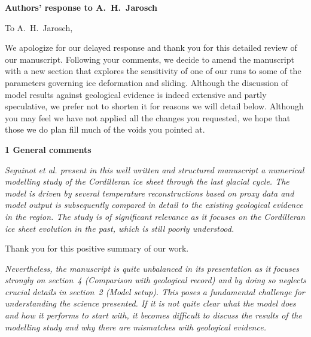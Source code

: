 \documentclass[10pt]{article}
\begin{document}
\textbf{Authors' response to A.~H.~Jarosch}
\bigskip


\newcommand{\doi}[1]{doi:\allowbreak\href{http://dx.doi.org/#1}{#1}}
\newcommand{\sechead}[1]{\bigskip\noindent\textbf{#1}}
\newcommand{\referee}[1]{\bigskip\textcolor{journalname}{\textit{#1}}}
\newcommand{\msquote}[1]{\begin{quote}\textit{#1}\end{quote}}
\newcommand{\todo}[1]{\textcolor{adgeored}{TODO: #1}}

To A.~H.~Jarosch,

We apologize for our delayed response and thank you for this detailed review of
our manuscript. Following your comments, we decide to amend the manuscript with
a new section that explores the sensitivity of one of our runs to some of the
parameters governing ice deformation and sliding. Although the discussion of
model results against geological evidence is indeed extensive and partly
speculative, we prefer not to shorten it for reasons we will detail below.
Although you may feel we have not applied all the changes you requested, we
hope that those we do plan fill much of the voids you pointed at.


\sechead{1 \quad General comments}

\referee{%
    Seguinot et al. present in this well written and structured manuscript a
    numerical modelling study of the Cordilleran ice sheet through the last
    glacial cycle. The model is driven by several temperature reconstructions
    based on proxy data and model output is subsequently compared in detail to
    the existing geological evidence in the region. The study is of significant
    relevance as it focuses on the Cordilleran ice sheet evolution in the past,
    which is still poorly understood.}

Thank you for this positive summary of our work.

\referee{%
    Nevertheless, the manuscript is quite unbalanced in its presentation as it
    focuses strongly on section~4 (Comparison with geological record) and by
    doing so neglects crucial details in section~2 (Model setup). This poses a
    fundamental challenge for understanding the science presented. If it is not
    quite clear what the model does and how it performs to start with, it
    becomes difficult to discuss the results of the modelling study and why
    there are mismatches with geological evidence.}
\end{document}
